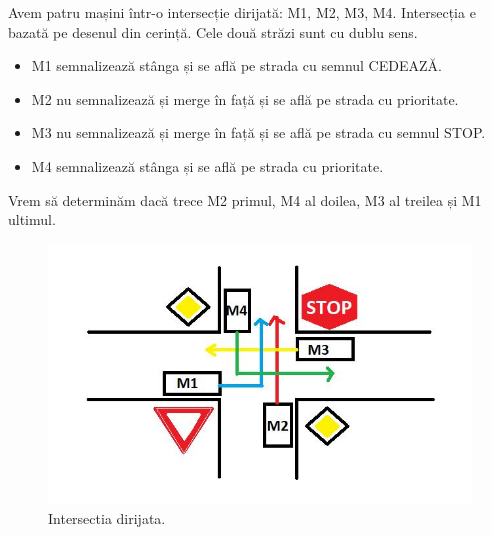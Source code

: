 Avem patru mașini într-o intersecție dirijată: M1, M2, M3, M4.
\newline
Intersecția e bazată pe desenul din cerință.
\newline
Cele două străzi sunt cu dublu sens.
\newline

\newline
 \begin{itemize}
    \setlength\itemsep{0em}
    \item M1 semnalizează stânga și se află pe strada cu semnul CEDEAZĂ.
    \item M2 nu semnalizează și merge în față și se află pe strada cu prioritate.
    \item M3  nu semnalizează și merge în față și se află pe strada cu semnul STOP.
    \item M4  semnalizează stânga și se află pe strada cu prioritate.

\end{itemize}

Vrem să determinăm dacă trece M2 primul, M4 al doilea, M3 al treilea și M1 ultimul.

\begin{figure}[htb]
  \includegraphics[width=\linewidth]{car2.jpg}
 \caption{Intersectia dirijata.}
  \label{fig:boat1}
  \end{figure}
